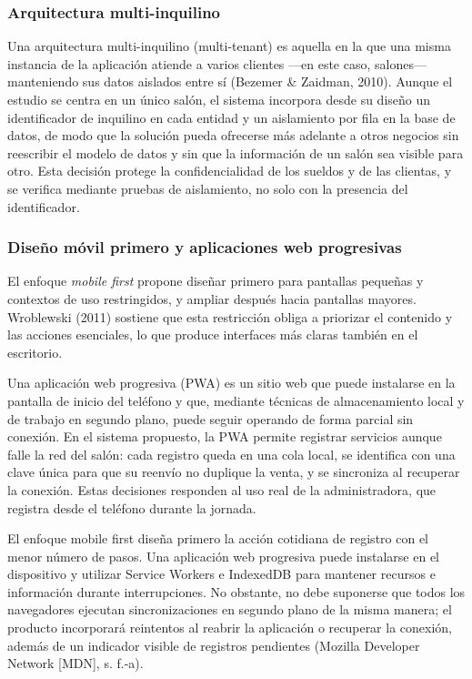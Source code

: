 \subsubsection{Arquitectura multi-inquilino}

Una arquitectura multi-inquilino (multi-tenant) es aquella en la que una misma instancia de la aplicación atiende a varios clientes —en este caso, salones— manteniendo sus datos aislados entre sí (Bezemer \& Zaidman, 2010). Aunque el estudio se centra en un único salón, el sistema incorpora desde su diseño un identificador de inquilino en cada entidad y un aislamiento por fila en la base de datos, de modo que la solución pueda ofrecerse más adelante a otros negocios sin reescribir el modelo de datos y sin que la información de un salón sea visible para otro. Esta decisión protege la confidencialidad de los sueldos y de las clientas, y se verifica mediante pruebas de aislamiento, no solo con la presencia del identificador.

\subsubsection{Diseño móvil primero y aplicaciones web progresivas}

El enfoque \textit{mobile first} propone diseñar primero para pantallas pequeñas y contextos de uso restringidos, y ampliar después hacia pantallas mayores. Wroblewski (2011) sostiene que esta restricción obliga a priorizar el contenido y las acciones esenciales, lo que produce interfaces más claras también en el escritorio.


Una aplicación web progresiva (PWA) es un sitio web que puede instalarse en la pantalla de inicio del teléfono y que, mediante técnicas de almacenamiento local y de trabajo en segundo plano, puede seguir operando de forma parcial sin conexión. En el sistema propuesto, la PWA permite registrar servicios aunque falle la red del salón: cada registro queda en una cola local, se identifica con una clave única para que su reenvío no duplique la venta, y se sincroniza al recuperar la conexión. Estas decisiones responden al uso real de la administradora, que registra desde el teléfono durante la jornada.


El enfoque mobile first diseña primero la acción cotidiana de registro con el menor número de pasos. Una aplicación web progresiva puede instalarse en el dispositivo y utilizar Service Workers e IndexedDB para mantener recursos e información durante interrupciones. No obstante, no debe suponerse que todos los navegadores ejecutan sincronizaciones en segundo plano de la misma manera; el producto incorporará reintentos al reabrir la aplicación o recuperar la conexión, además de un indicador visible de registros pendientes (Mozilla Developer Network [MDN], s. f.-a).

